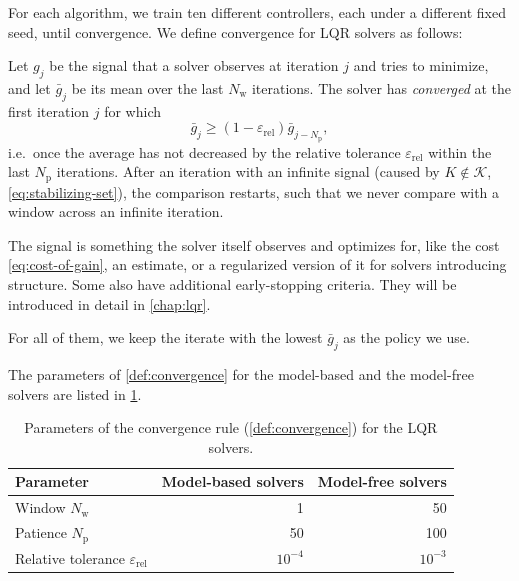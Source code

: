 For each algorithm, we train ten different controllers, each under a different fixed seed,
until convergence. We define convergence for LQR solvers as follows:
\begin{definition}[Convergence]
\label{def:convergence}
Let $g_j$ be the signal that a solver observes at iteration $j$ and tries to minimize, and let $\bar{g}_j$ be its
mean over the last $N_{\mathrm{w}}$ iterations. The solver has \emph{converged} at the first
iteration $j$ for which
\begin{equation*}
    \bar{g}_j \ge \left( 1 - \varepsilon_{\mathrm{rel}} \right) \bar{g}_{j - N_{\mathrm{p}}} ,
\end{equation*}
i.e.\ once the average has not decreased by the relative tolerance $\varepsilon_{\mathrm{rel}}$
within the last $N_{\mathrm{p}}$ iterations. After an iteration with an
infinite signal (caused by $K \notin \mathcal{K}$, \eqref{eq:stabilizing-set}), the comparison
restarts, such that we never compare with a window across an infinite iteration.
\end{definition}

The signal is something the solver itself observes and optimizes for,
like the cost \eqref{eq:cost-of-gain}, an estimate, or a regularized
version of it for solvers introducing structure. Some also have
additional early-stopping criteria. They will be introduced
in detail in \cref{chap:lqr}.

For all of them, we keep the iterate with the lowest
$\bar{g}_j$ as the policy we use.

The parameters of \cref{def:convergence} for the model-based and the model-free solvers are
listed in \cref{tab:convergence-lqr}.
\begin{table}[htbp]
    \centering
    \caption{Parameters of the convergence rule (\cref{def:convergence}) for the LQR solvers.}
    \label{tab:convergence-lqr}
    \begin{tabular}{@{}lrr@{}}
        \toprule
        Parameter & Model-based solvers & Model-free solvers \\
        \midrule
        Window $N_{\mathrm{w}}$                   & 1         & 50        \\
        Patience $N_{\mathrm{p}}$                 & 50        & 100       \\
        Relative tolerance $\varepsilon_{\mathrm{rel}}$ & $10^{-4}$ & $10^{-3}$ \\
        \bottomrule
    \end{tabular}
\end{table}

